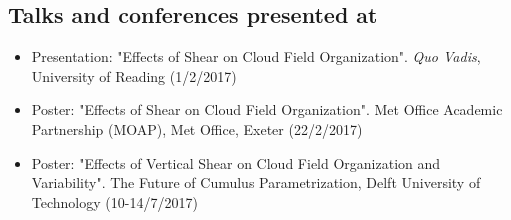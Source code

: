 \documentclass[11pt,a4paper]{article}
\begin{document}
\subsection*{Talks and conferences presented at}

\begin{itemize}
  \item Presentation: "Effects of Shear on Cloud Field Organization". \textit{Quo Vadis}, University of Reading (1/2/2017)
  \item Poster: "Effects of Shear on Cloud Field Organization". Met Office Academic Partnership (MOAP), Met Office, Exeter (22/2/2017)
  \item Poster: "Effects of Vertical Shear on Cloud Field Organization and Variability". The Future of Cumulus Parametrization, Delft University of Technology (10-14/7/2017)
\end{itemize}
\end{document}
